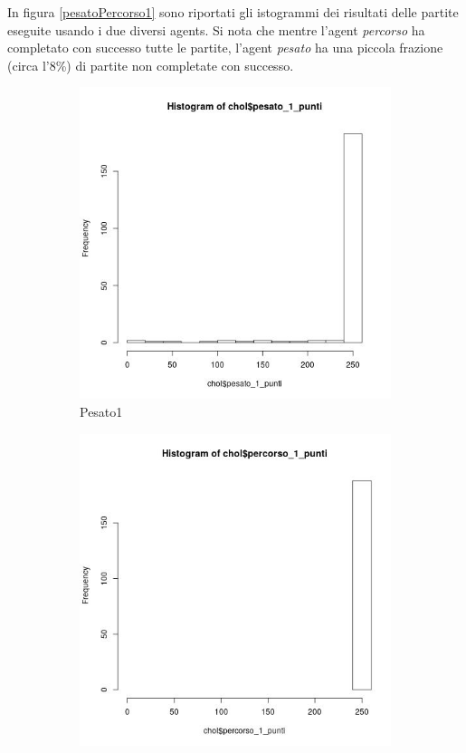 \documentclass[8pt]{book}
\begin{document}
In figura \ref{pesatoPercorso1} sono riportati gli istogrammi dei risultati delle partite eseguite usando i due diversi agents. Si nota che mentre l'agent \emph{percorso} ha completato con successo tutte le partite, l'agent \emph{pesato} ha una piccola frazione (circa l'8\%) di partite non completate con successo.

\begin{figure}
  \centering
  \begin{subfigure}[b]{0.49\textwidth}
    \includegraphics[width=\textwidth]{img/pesato_1_punteggio.png}
    \caption{Pesato1}
    \label{Pesato1}
   \end{subfigure}
  \begin{subfigure}[b]{0.49\textwidth}
    \includegraphics[width=\textwidth]{img/percorso_1_punteggio.png}

\end{subfigure}
\end{figure}
\end{document}
